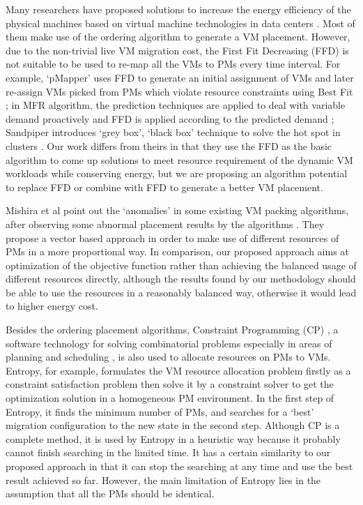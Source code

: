 \documentclass[10pt, conference, compsocconf]{IEEEtran}
\begin{document}
Many researchers have proposed solutions to increase the energy efficiency of
the physical machines based on virtual machine technologies in data centers
\cite{verma08}\cite{verma09}\cite{wood09}\cite{kusic09}\cite{stillwell10}. 
Most of them make use of the ordering algorithm to generate a VM
placement. However, due to the non-trivial live VM migration cost, the First
Fit Decreasing (FFD) is not suitable to be used to re-map all the VMs to PMs every time interval.
For example, `pMapper' uses FFD to generate an initial assignment of VMs and later re-assign
VMs picked from PMs which violate resource constraints using Best Fit
\cite{verma08}; in MFR algorithm\cite{Bobroff07}, the prediction techniques are applied to deal
with variable demand proactively and FFD is applied according to the predicted
demand ; Sandpiper introduces `grey box', `black box' technique
to solve the hot spot in clusters \cite{wood09}. Our work differs from theirs in that they use the FFD as
the basic algorithm to come up solutions to meet resource requirement of the dynamic VM
workloads while conserving energy, but we are proposing an algorithm potential
to replace FFD or combine with FFD to generate a better VM placement.

Mishira et al\cite{mashira11} point out the `anomalies' in some existing VM packing algorithms,
after observing some abnormal placement results by the
algorithms . They propose a vector based approach in order to
make use of different resources of PMs in a more proportional way. In comparison, our proposed approach aims at
optimization of the objective function rather than achieving the balanced usage
of different resources directly, although the results found by our methodology should be
able to use the resources in a reasonably balanced way, otherwise it would lead
to higher energy cost.

Besides the ordering placement algorithms, Constraint Programming (CP) , a
software technology for solving combinatorial problems especially in areas of
planning and scheduling \cite{nakada09}, is also used to allocate resources on
PMs to VMs.
Entropy\cite{hermenier09}, for example, formulates the VM resource allocation
problem firstly as a constraint satisfaction problem then solve it by a
constraint solver to get the optimization solution in a homogeneous PM
environment. In the first step of Entropy, it finds the minimum number of PMs,
and searches for a `best' migration configuration to the new state in the second
step.
Although CP is a complete method, it is used by Entropy in a heuristic way
because it probably cannot finish searching in the limited time. It has a
certain similarity to our proposed approach in that it can stop the searching at
any time and use the best result achieved so far. However, the main limitation
of Entropy lies in the assumption that all the PMs should be identical.
\end{document}
